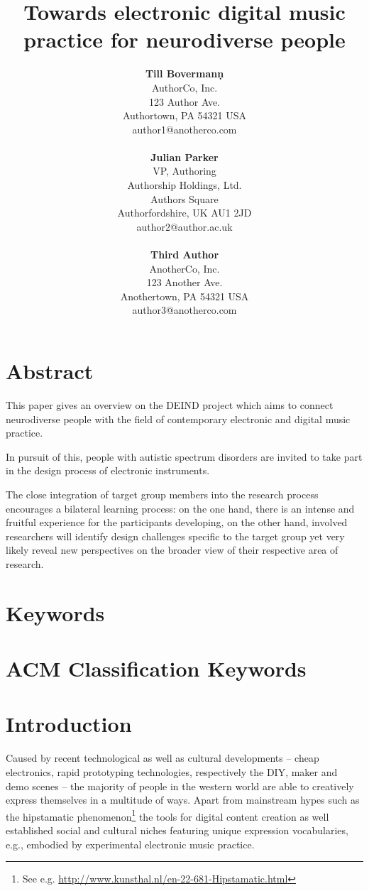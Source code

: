 \documentclass{chi-ext}
\title{Towards electronic digital music practice for neurodiverse people}
\author{
  \textbf{Till Bovermanṇ} \\
  AuthorCo, Inc. \\
  123 Author Ave. \\
  Authortown, PA 54321 USA \\
  author1@anotherco.com \\
  \\
  \textbf{Julian Parker} \\
  VP, Authoring \\
  Authorship Holdings, Ltd. \\
  Authors Square \\
  Authorfordshire, UK AU1 2JD \\
  author2@author.ac.uk \\
  \\
  \textbf{Third Author} \\
  AnotherCo, Inc. \\
  123 Another Ave. \\
  Anothertown, PA 54321 USA \\
  author3@anotherco.com \\
}
\begin{document}
\maketitle

\begin{multicols}{2}
  
\makeauthors
\makecopyright

\section{Abstract}
This paper gives an overview on the DEIND project which aims to connect neurodiverse people with the field of contemporary electronic and digital music practice. 

In pursuit of this, people with autistic spectrum disorders are invited to take part in the design process of electronic instruments.

The close integration of target group members into the research process encourages a bilateral learning process: on the one hand, there is an intense and fruitful experience for the participants developing, on the other hand, involved researchers will identify design challenges specific to the target group yet very likely reveal new perspectives on the broader view of their respective area of research.

\section{Keywords}
\makeatletter \@keywords \makeatother

\section{ACM Classification Keywords}
\makeatletter \@acmclassification \makeatother


\section{Introduction}

Caused by recent technological as well as cultural developments -- cheap electronics, rapid prototyping technologies, respectively the DIY, maker and demo scenes -- the majority of people in the western world are able to creatively express themselves in a multitude of ways. 
Apart from mainstream hypes such as the hipstamatic phenomenon\footnote{See e.g. \url{http://www.kunsthal.nl/en-22-681-Hipstamatic.html}} the tools for digital content creation as well established social and cultural niches featuring unique expression vocabularies, e.g., embodied by experimental electronic music practice.


\end{multicols}
\end{document}
